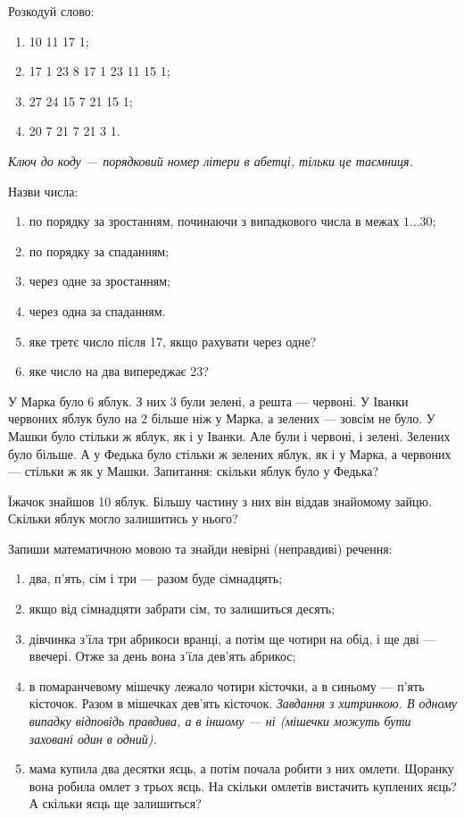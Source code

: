 \problem
Розкодуй слово:
\begin{enumerate}
    \item 10 11 17 1; 
    \item 17 1 23 8 17 1 23 11 15 1;
    \item 27 24 15 7 21 15 1;
    \item 20 7 21 7 21 3 1.
\end{enumerate}

\emph{
Ключ до коду --- порядковий номер літери в абетці, тільки це таємниця.
}


\problem
Назви числа:
\begin{enumerate}
    \item по порядку за зростанням, починаючи з випадкового числа
    в межах $1\ldots30$;
    \item по порядку за спаданням;
    \item через одне за зростанням;
    \item через одна за спаданням.
    \item яке третє число після 17, якщо рахувати через одне?
    \item яке число на два випереджає 23?
\end{enumerate}


\problem
У Марка було 6 яблук. З них 3 були зелені, а решта --- червоні.
У Іванки червоних яблук було на 2 більше ніж у Марка,
а зелених --- зовсім не було.
У Машки було стільки ж яблук, як і у Іванки.
Але були і червоні, і зелені. Зелених було більше.
А у Федька було стільки ж зелених яблук, як і у Марка,
а червоних --- стільки ж як у Машки.
Запитання: скільки яблук було у Федька?


\problem
Їжачок знайшов 10 яблук.
Більшу частину з них він віддав знайомому зайцю.
Скільки яблук могло залишитись у нього?


\problem
Запиши математичною мовою та знайди невірні (неправдиві) речення:
\begin{enumerate}
    \item два, п'ять, сім і три --- разом буде сімнадцять;
    \item якщо від сімнадцяти забрати сім, то залишиться десять;
    \item дівчинка з'їла три абрикоси вранці, а потім ще чотири на обід,
    і ще дві --- ввечері. Отже за день вона з'їла дев'ять абрикос;
    \item в помаранчевому мішечку лежало чотири кісточки,
    а в синьому --- п'ять кісточок. Разом в мішечках дев'ять кісточок.
    \emph{Завдання з хитринкою. В одному випадку відповідь правдива,
    а в іншому --- ні (мішечки можуть бути заховані один в одний).}
    \item мама купила два десятки яєць, а потім почала робити з них омлети.
    Щоранку вона робила омлет з трьох яєць.
    На скільки омлетів вистачить куплених яєць? А скільки яєць ще залишиться?
\end{enumerate}


